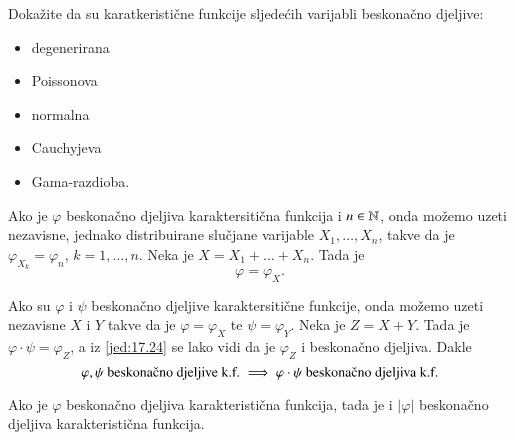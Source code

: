 \begin{zad} \label{zad:17.23}
    Doka\v zite da su karatkeristi\v cne funkcije sljede\' cih varijabli beskona\v cno djeljive:
    \begin{itemize}
        \item degenerirana
        \item Poissonova
        \item normalna
        \item Cauchyjeva
        \item Gama-razdioba.
    \end{itemize}
\end{zad}

Ako je $\varphi$ beskona\v cno djeljiva karaktersiti\v cna funkcija i $n \in \mathbb{N}$, onda mo\v zemo uzeti nezavisne, jednako distribuirane slu\v cjane varijable $X_1, \ldots, X_n$, takve da je $\varphi_{X_k} = \varphi_n$, $k = 1, \ldots, n$.
Neka je $X = X_1 + \ldots + X_n$.
Tada je
\begin{equation}    \label{jed:17.24}
    \varphi = \varphi_X.
\end{equation}

Ako su $\varphi$ i $\psi$ beskona\v cno djeljive karaktersiti\v cne funkcije, onda mo\v zemo uzeti nezavisne $X$ i $Y$ takve da je $\varphi = \varphi_X$ te $\psi = \varphi_Y$.
Neka je $Z = X + Y$.
Tada je $\varphi \cdot \psi = \varphi_Z$, a iz \eqref{jed:17.24} se lako vidi da je $\varphi_Z$ i beskona\v cno djeljiva.
Dakle
\begin{equation}    \label{jed:17.25}
    \varphi, \psi \textnormal{ beskona\v cno djeljive k.f.} \implies \varphi \cdot \psi \textnormal{ beskona\v cno djeljiva k.f.}
\end{equation}

\begin{zad} \label{zad:17.26}
    Ako je $\varphi$ beskona\v cno djeljiva karakteristi\v cna funkcija, tada je i $|\varphi|$ beskona\v cno djeljiva karakteristi\v cna funkcija.
\end{zad}